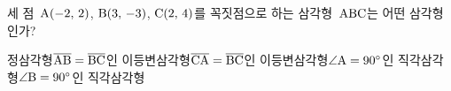 세 점~$\mathrm{A}(-2,\mkern3mu 2)$, $\mathrm{B}(3,\mkern3mu -3)$, $\mathrm{C}(2,\mkern3mu 4)$를 꼭짓점으로 하는 삼각형~$\mathrm{ABC}$는 어떤 삼각형인가?
\begin{choicesv}{정삼각형}{$\overline{\mathrm{AB}}=\overline{\mathrm{BC}}$인 이등변삼각형}{$\overline{\mathrm{CA}}=\overline{\mathrm{BC}}$인 이등변삼각형}{$\angle\mathrm{A}=90^\circ$인 직각삼각형}{$\angle\mathrm{B}=90^\circ$인 직각삼각형}\end{choicesv}
